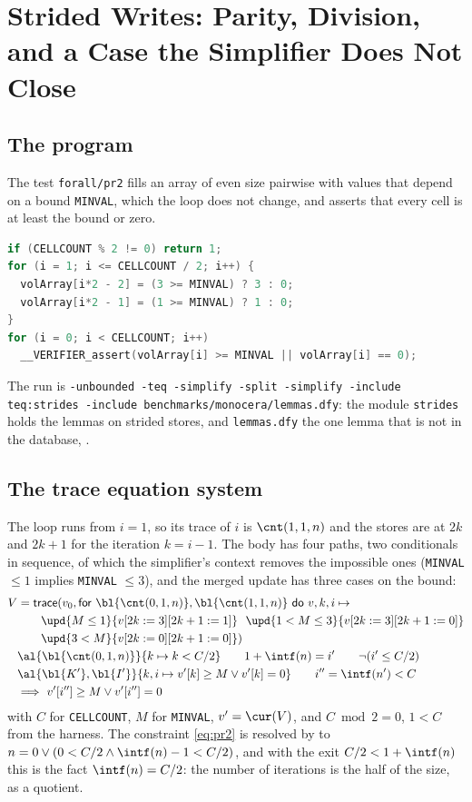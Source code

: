 \section{Strided Writes: Parity, Division, and a Case the Simplifier Does Not Close}\label{sec:pr2}

\subsection{The program}
The test \texttt{forall/pr2} fills an array of even size pairwise with values that depend on a bound
\texttt{MINVAL}, which the loop does not change, and asserts that every cell is at least the bound or zero.
\begin{lstlisting}[language=C]
if (CELLCOUNT % 2 != 0) return 1;
for (i = 1; i <= CELLCOUNT / 2; i++) {
  volArray[i*2 - 2] = (3 >= MINVAL) ? 3 : 0;
  volArray[i*2 - 1] = (1 >= MINVAL) ? 1 : 0;
}
for (i = 0; i < CELLCOUNT; i++)
  __VERIFIER_assert(volArray[i] >= MINVAL || volArray[i] == 0);
\end{lstlisting}
The run is \texttt{-unbounded -teq -simplify -split -simplify -include teq:strides -include
benchmarks/monocera/lemmas.dfy}: the module \texttt{strides} holds the lemmas on strided stores, and
\texttt{lemmas.dfy} the one lemma that is not in the database, .

\subsection{The trace equation system}
The loop runs from $i = 1$, so its trace of $i$ is $\cnt(1, 1, n)$ and the stores are at $2k$ and $2k + 1$
for the iteration $k = i - 1$. The body has four paths, two conditionals in sequence, of which the
simplifier's context removes the impossible ones (\texttt{MINVAL} $\le 1$ implies \texttt{MINVAL} $\le 3$),
and the merged update has three cases on the bound:
\begin{align}
  V &= \mathsf{trace}(v_0, \mathsf{for}\ \bl{\cnt(0, 1, n)}, \bl{\cnt(1, 1, n)}\ \mathsf{do}\ v, k, i \mapsto {} \nonumber\\
  &\qquad \upd{M \le 1}{v[2k := 3][2k + 1 := 1]}\ \ \upd{1 < M \le 3}{v[2k := 3][2k + 1 := 0]} \nonumber\\
  &\qquad \upd{3 < M}{v[2k := 0][2k + 1 := 0]}) \label{eq:pr1}\\
  &\al{\bl{\cnt(0, 1, n)}}{k \mapsto k < C / 2} \qquad 1 + \intf(n) = i' \qquad \neg(i' \le C / 2) \label{eq:pr2}\\
  &\al{\bl{K'}, \bl{I'}}{k, i \mapsto v'[k] \ge M \vee v'[k] = 0} \qquad i'' = \intf(n') < C \label{eq:pr3}\\
  &\Longrightarrow\ v'[i''] \ge M \vee v'[i''] = 0 \nonumber
\end{align}
with $C$ for \texttt{CELLCOUNT}, $M$ for \texttt{MINVAL}, $v' = \cur(V)$, and $C \bmod 2 = 0$, $1 < C$ from
the harness. The constraint \eqref{eq:pr2} is resolved by  to
$n = 0 \vee (0 < C/2 \wedge \intf(n) - 1 < C/2)$, and with the exit $C/2 < 1 + \intf(n)$ this is the fact
$\intf(n) = C / 2$: the number of iterations is the half of the size, as a quotient.

